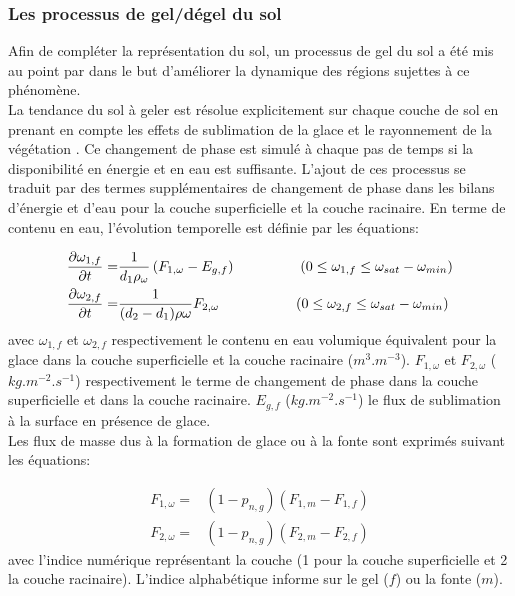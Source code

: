 \subsubsection{\selectfont Les processus de gel/dégel du sol}

Afin de compléter la représentation du sol, un processus de gel du sol a été mis au point par \citet{decharme2016} dans le but d'améliorer la dynamique des régions sujettes à ce phénomène. \\
La tendance du sol à geler est résolue explicitement sur chaque couche de sol en prenant en compte les effets de sublimation de la glace et le rayonnement de la végétation \citep{boone2000}. Ce changement de phase est simulé à chaque pas de temps si la disponibilité en énergie et en eau est suffisante. L'ajout de ces processus se traduit par des termes supplémentaires de changement de phase dans les bilans d'énergie et d'eau pour la couche superficielle et la couche racinaire. En terme de contenu en eau, l'évolution temporelle est définie par les équations:

 \begin{align}
 \dfrac{\partial \omega_{1,f}}{\partial t} =& \dfrac{1}{d_{1} \rho_{\omega}}\left(F_{1,\omega} - E_{g,f}\right) \qquad 
 \hskip.36in
 \left(0 \leq\omega_{1,f} \leq  \omega_{sat} - \omega_{min}\right)
 \\
 \dfrac{\partial \omega_{2,f}}{\partial t} =& \dfrac{1}{(d_{2}-d_{1})\rho\omega} F_{2,\omega} \qquad 
 \hskip.46in
 \left(0 \leq \omega_{2,f} \leq  \omega_{sat} - \omega_{min}\right)
 \end{align}
avec $\omega_{1,f}$ et $\omega_{2,f}$ respectivement le contenu en eau volumique équivalent pour la glace dans la couche superficielle et la couche racinaire ($m^{3}.m^{-3}$). $F_{1,\omega}$ et $F_{2,\omega}$ ($kg.m^{-2}.s^{-1}$) respectivement le terme de changement de phase dans la couche superficielle et dans la couche racinaire. $E_{g,f}$ ($kg.m^{-2}.s^{-1}$) le flux de sublimation à la surface en présence de glace.\\

Les flux de masse dus à la formation de glace ou à la fonte sont exprimés suivant les équations:

\begin{align}
 F_{1,\omega} =& (1-p_{n,g}) (F_{1,m}-F_{1,f})
 \\
 F_{2,\omega} =& (1-p_{n,g}) (F_{2,m}-F_{2,f}) 
\end{align}
avec l'indice numérique représentant la couche (1 pour la couche superficielle et 2 la couche racinaire). L'indice alphabétique informe sur le gel ($f$) ou la fonte ($m$).\\

